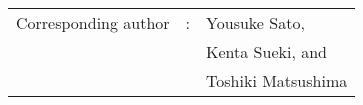 {\bf \Large
\begin{tabular}{ccl}
\hline
  Corresponding author & : & Yousuke Sato, \\
  & & Kenta Sueki, and \\ 
  & & Toshiki Matsushima \\
\hline
\end{tabular}
}

